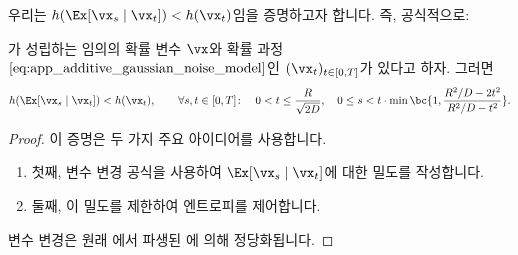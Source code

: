 \documentclass[../../book-main_ko.tex]{subfiles}
\begin{document}
우리는 \(h(\Ex[\vx_{s} \mid \vx_{t}]) < h(\vx_{t})\)임을 증명하고자 합니다. 즉, 공식적으로:
\begin{theorem}\label{thm:conditioning_reduces_entropy}
    가 성립하는 임의의 확률 변수 \(\vx\)와 확률 과정 \(\eqref{eq:app_additive_gaussian_noise_model}\)인 \((\vx_{t})_{t \in [0, T]}\)가 있다고 하자. 그러면 
    \begin{equation}
        h(\Ex[\vx_{s} \mid \vx_{t}]) < h(\vx_{t}), \qquad \forall s, t \in [0, T] \colon \quad 0 < t \leq \frac{R}{\sqrt{2D}}, \quad 0 \leq s  < t\cdot\min\bc{1, \frac{R^{2}/D - 2t^{2}}{R^{2}/D - t^{2}}}.
    \end{equation}
\end{theorem}
\begin{proof}
    이 증명은 두 가지 주요 아이디어를 사용합니다.
    \begin{enumerate}
        \item 첫째, 변수 변경 공식을 사용하여 \(\Ex[\vx_{s} \mid \vx_{t}]\)에 대한 밀도를 작성합니다.
        \item 둘째, 이 밀도를 제한하여 엔트로피를 제어합니다.
    \end{enumerate}
    변수 변경은 원래 \cite{Gribonval2011-pf}에서 파생된 에 의해 정당화됩니다.


\end{proof}
\end{document}
